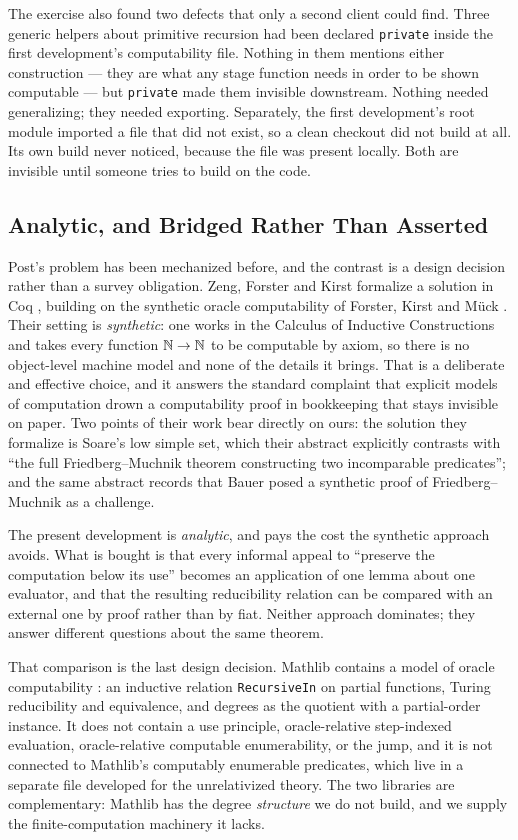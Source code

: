 The exercise also found two defects that only a second client could find.
Three generic helpers about primitive recursion had been declared
\texttt{private} inside the first development's computability file.
Nothing in them mentions either construction --- they are what any stage
function needs in order to be shown computable --- but \texttt{private}
made them invisible downstream.  Nothing needed generalizing; they needed
exporting.  Separately, the first development's root module imported a file
that did not exist, so a clean checkout did not build at all.  Its own
build never noticed, because the file was present locally.  Both are
invisible until someone tries to build on the code.

\subsection{Analytic, and Bridged Rather Than Asserted}
\label{sec:related}

Post's problem has been mechanized before, and the contrast is a design
decision rather than a survey obligation.  Zeng, Forster and Kirst
formalize a solution in Coq \cite{zeng2024post}, building on the synthetic
oracle computability of Forster, Kirst and M\"uck
\cite{forster2023oracle}.  Their setting is \emph{synthetic}: one works in
the Calculus of Inductive Constructions and takes every function
$\mathbb{N}\to\mathbb{N}$ to be computable by axiom, so there is no object-level machine
model and none of the details it brings.  That is a deliberate and
effective choice, and it answers the standard complaint that explicit
models of computation drown a computability proof in bookkeeping that stays
invisible on paper.  Two points of their work bear directly on ours: the
solution they formalize is Soare's low simple set, which their abstract
explicitly contrasts with ``the full Friedberg--Muchnik theorem
constructing two incomparable predicates''; and the same abstract records
that Bauer posed a synthetic proof of Friedberg--Muchnik as a challenge.

The present development is \emph{analytic}, and pays the cost the synthetic
approach avoids.  What is bought is that every informal appeal to
``preserve the computation below its use'' becomes an application of one
lemma about one evaluator, and that the resulting reducibility relation can
be compared with an external one by proof rather than by fiat.  Neither
approach dominates; they answer different questions about the same theorem.

That comparison is the last design decision.  Mathlib contains a model of
oracle computability \cite{mathlibTuringDegree}: an inductive relation
\texttt{RecursiveIn} on partial functions, Turing reducibility and
equivalence, and degrees as the quotient with a partial-order instance.  It
does not contain a use principle, oracle-relative step-indexed evaluation,
oracle-relative computable enumerability, or the jump, and it is not
connected to Mathlib's computably enumerable predicates, which live in a
separate file developed for the unrelativized theory.  The two libraries
are complementary: Mathlib has the degree \emph{structure} we do not build,
and we supply the finite-computation machinery it lacks.

